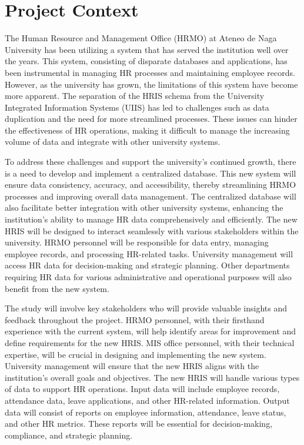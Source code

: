 \section{Project Context}
    
    The Human Resource and Management Office (HRMO) at Ateneo de Naga University has been utilizing a system that has served the institution well over the years. This system, consisting of disparate databases and applications, has been instrumental in managing HR processes and maintaining employee records. However, as the university has grown, the limitations of this system have become more apparent. The separation of the HRIS schema from the University Integrated Information Systems (UIIS) has led to challenges such as data duplication and the need for more streamlined processes. These issues can hinder the effectiveness of HR operations, making it difficult to manage the increasing volume of data and integrate with other university systems.
    
    To address these challenges and support the university's continued growth, there is a need to develop and implement a centralized database. This new system will ensure data consistency, accuracy, and accessibility, thereby streamlining HRMO processes and improving overall data management. The centralized database will also facilitate better integration with other university systems, enhancing the institution's ability to manage HR data comprehensively and efficiently. The new HRIS will be designed to interact seamlessly with various stakeholders within the university. HRMO personnel will be responsible for data entry, managing employee records, and processing HR-related tasks. University management will access HR data for decision-making and strategic planning. Other departments requiring HR data for various administrative and operational purposes will also benefit from the new system.

    The study will involve key stakeholders who will provide valuable insights and feedback throughout the project. HRMO personnel, with their firsthand experience with the current system, will help identify areas for improvement and define requirements for the new HRIS. MIS office personnel, with their technical expertise, will be crucial in designing and implementing the new system. University management will ensure that the new HRIS aligns with the institution's overall goals and objectives. The new HRIS will handle various types of data to support HR operations. Input data will include employee records, attendance data, leave applications, and other HR-related information. Output data will consist of reports on employee information, attendance, leave status, and other HR metrics. These reports will be essential for decision-making, compliance, and strategic planning.
    
